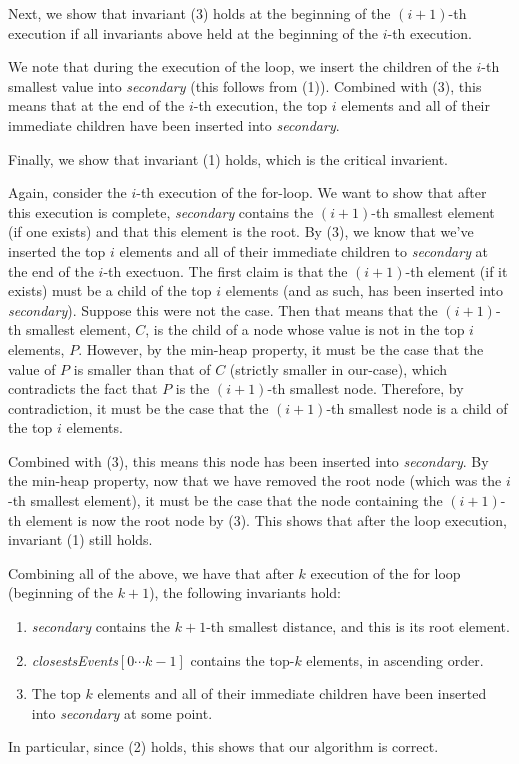 \documentclass[12pt]{exam}
\begin{document}
\begin{questions}
\begin{solution}
Next, we show that invariant (3) holds at the beginning of the $(i + 1)$-th execution if all invariants above held at the beginning of the $i$-th execution.

We note that during the execution of the loop, we insert the children of the $i$-th smallest value into \textit{secondary} (this follows from (1)). Combined with (3), this means that at the end of the $i$-th execution, the top $i$ elements and all of their immediate children have been inserted into \textit{secondary}.

Finally, we show that invariant (1) holds, which is the critical invarient. 

Again, consider the $i$-th execution of the for-loop. We want to show that after this execution is complete, \textit{secondary} contains the $(i+1)$-th smallest element (if one exists) and that this element is the root. By (3), we know that we've inserted the top $i$ elements and all of their immediate children to \textit{secondary} at the end of the $i$-th exectuon. The first claim is that the $(i+1)$-th element (if it exists) must be a child of the top $i$ elements (and as such, has been inserted into \textit{secondary}). Suppose this were not the case. Then that means that the $(i+1)$-th smallest element, $C$, is the child of a node whose value is not in the top $i$ elements, $P$. However, by the min-heap property, it must be the case that the value of $P$ is smaller than that of $C$ (strictly smaller in our-case), which contradicts the fact that $P$ is the $(i+1)$-th smallest node. Therefore, by contradiction, it must be the case that the $(i+1)$-th smallest node is a child of the top $i$ elements.

Combined with (3), this means this node has been inserted into \textit{secondary}. By the min-heap property, now that we have removed the root node (which was the $i$-th smallest element), it must be the case that the node containing the $(i+1)$-th element is now the root node by (3). This shows that after the loop execution, invariant (1) still holds.


Combining all of the above, we have that after $k$ execution of the for loop (beginning of the $k+1$), the following invariants hold:
\begin{enumerate}
  \item \textit{secondary} contains the $k+1$-th smallest distance, and this is its root element.
  \item \textit{closestsEvents}$[0 \cdots k-1]$ contains the top-$k$ elements, in ascending order.
  \item The top $k$ elements and all of their immediate children have been inserted into \textit{secondary} at some point.
\end{enumerate}
In particular, since (2) holds, this shows that our algorithm is correct.


\end{solution}
\end{questions}
\end{document}

